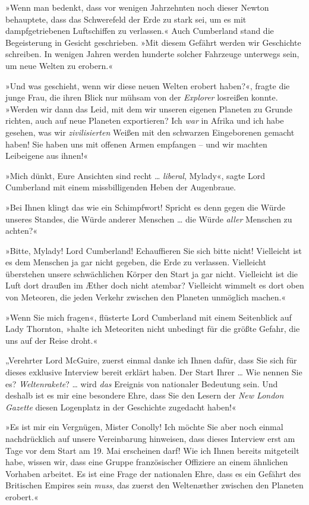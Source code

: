 »Wenn man bedenkt, dass vor wenigen Jahrzehnten noch dieser Newton
behauptete, dass das Schwerefeld der Erde zu stark sei, um es mit
dampfgetriebenen Luftschiffen zu verlassen.« Auch Cumberland stand
die Begeisterung in Gesicht geschrieben. »Mit diesem Gefährt werden
wir Geschichte schreiben. In wenigen Jahren werden hunderte solcher
Fahrzeuge unterwegs sein, um neue Welten zu erobern.«

»Und was geschieht, wenn wir diese neuen Welten erobert haben?«,
fragte die junge Frau, die ihren Blick nur mühsam von der
\emph{Explorer} losreißen konnte. »Werden wir dann das Leid, mit
dem wir unseren eigenen Planeten zu Grunde richten, auch auf neue
Planeten exportieren? Ich \emph{war} in Afrika und ich habe
gesehen, was wir \emph{zivilisierten} Weißen mit den schwarzen
Eingeborenen gemacht haben! Sie haben uns mit offenen Armen
empfangen – und wir machten Leibeigene aus ihnen!«

»Mich dünkt, Eure Ansichten sind recht … \emph{liberal}, Mylady«,
sagte Lord Cumberland mit einem missbilligenden Heben der
Augenbraue.

»Bei Ihnen klingt das wie ein Schimpfwort! Spricht es denn gegen
die Würde unseres Standes, die Würde anderer Menschen … die Würde
\emph{aller} Menschen zu achten?«

»Bitte, Mylady! Lord Cumberland! Echauffieren Sie sich bitte nicht!
Vielleicht ist es dem Menschen ja gar nicht gegeben, die Erde zu
verlassen. Vielleicht überstehen unsere schwächlichen Körper den
Start ja gar nicht. Vielleicht ist die Luft dort draußen im Æther
doch nicht atembar? Vielleicht wimmelt es dort oben von Meteoren,
die jeden Verkehr zwischen den Planeten unmöglich machen.«

»Wenn Sie mich fragen«, flüsterte Lord Cumberland mit einem
Seitenblick auf Lady Thornton, »halte ich Meteoriten nicht
unbedingt für die größte Gefahr, die uns auf der Reise droht.«

\tb

„Verehrter Lord McGuire, zuerst einmal danke ich Ihnen dafür, dass
Sie sich für dieses exklusive Interview bereit erklärt haben. Der
Start Ihrer … Wie nennen Sie es? \emph{Weltenrakete}? … wird
\emph{das} Ereignis von nationaler Bedeutung sein. Und deshalb ist
es mir eine besondere Ehre, dass Sie den Lesern der
\emph{New London Gazette} diesen Logenplatz in der Geschichte
zugedacht haben!«

»Es ist mir ein Vergnügen, Mister Conolly! Ich möchte Sie aber noch
einmal nachdrücklich auf unsere Vereinbarung hinweisen, dass dieses
Interview erst am Tage vor dem Start am 19. Mai erscheinen darf!
Wie ich Ihnen bereits mitgeteilt habe, wissen wir, dass eine Gruppe
französischer Offiziere an einem ähnlichen Vorhaben arbeitet. Es
ist eine Frage der nationalen Ehre, dass es ein Gefährt des
Britischen Empires sein \emph{muss}, das zuerst den Weltenæther
zwischen den Planeten erobert.«

